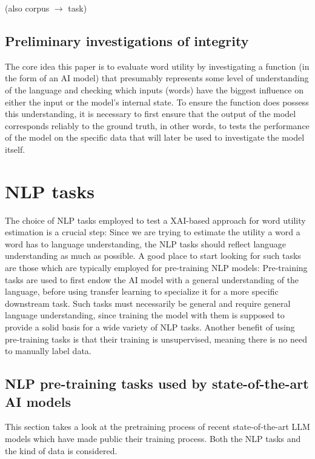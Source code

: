 (also corpus $\rightarrow$ task)
\subsection{Preliminary investigations of integrity}
The core idea this paper is to evaluate word utility by investigating a function (in the form of an AI model) that presumably represents some level of understanding of the language and checking which inputs (words) have the biggest influence on either the input or the model's internal state.
To ensure the function does possess this understanding, it is necessary to first ensure that the output of the model corresponds reliably to the ground truth, in other words, to tests the performance of the model on the specific data that will later be used to investigate the model itself.



\section{NLP tasks}
The choice of NLP tasks employed to test a XAI-based approach for word utility estimation is a crucial step:
Since we are trying to estimate the utility a word a word has to language understanding, the NLP tasks should reflect language understanding as much as possible.
A good place to start looking for such tasks are those which are typically employed for pre-training NLP models:
Pre-training tasks are used to first endow the AI model with a general understanding of the language, before using transfer learning to specialize it for a more specific downstream task.
Such tasks must necessarily be general and require general language understanding, since training the model with them is supposed to provide a solid basis for a wide variety of NLP tasks.
Another benefit of using pre-training tasks is that their training is unsupervised, meaning there is no need to manually label data.

\subsection{NLP pre-training tasks used by state-of-the-art AI models}
This section takes a look at the pretraining process of recent state-of-the-art LLM models which have made public their training process.
Both the NLP tasks and the kind of data is considered.


